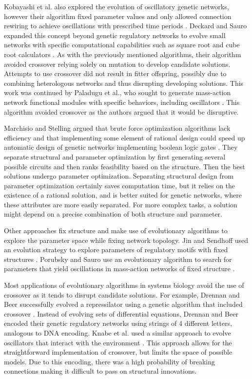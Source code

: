 \documentclass[12pt]{report}
\begin{document}
Kobayashi et al. also explored the evolution of oscillatory genetic networks, however their algorithm fixed parameter values and only allowed connection rewiring to achieve oscillations with prescribed time periods \cite{kobayashi_evolutionary_2010}. Deckard and Sauro expanded this concept beyond genetic regulatory networks to evolve small networks with specific computational capabilities such as square root and cube root calculators \cite{deckard_preliminary_2004}. As with the previously mentioned algorithms, their algorithm avoided crossover relying solely on mutation to develop candidate solutions. Attempts to use crossover did not result in fitter offspring, possibly due to combining heterologous networks and thus disrupting developing solutions. This work was continued by Paladugu et al., who sought to generate mass-action network functional modules with specific behaviors, including oscillators \cite{Paladugu2006}.  This algorithm avoided crossover as the authors argued that it would be disruptive.

Marchisio and Stelling argued that brute force optimization algorithms lack efficiency and that implementing some element of rational design could speed up automatic design of genetic networks implementing boolean logic gates \cite{marchisio_automatic_2011}. They separate structural and parameter optimization by first generating several possible circuits and then ranks feasibility based on the structure. Then the best solutions undergo parameter optimization. Separating structural design from parameter optimization certainly saves computation time, but it relies on the existence of a rational solution, and is better suited for genetic networks, where these attributes are more easily separated. For more complex tasks, a solution might depend on a precise combination of both structure and parameter.

Other approaches fix structure and make use of evolutionary algorithms to explore the parameter space while fixing network topology. Jin and Sendhoff used an evolution strategy to explore parameters of regulatory motifs with fixed structures \cite{jin_evolving_2008}. Porubsky and Sauro use an evolutionary algorithm to search for parameters that yield oscillations in mass-action networks of fixed structure \cite{porubsky2019}.

Most applications of evolutionary algorithms in systems biology avoid the use of crossover as it tends to disrupt candidate solutions. For example, Drennan and Beer successfully evolved a repressilator using a genetic algorithm that included crossover \cite{drennan_beer}. Instead of evolving sets of differential equations, Drennan and Beer encoded their genetic regulatory networks using strings of 4 different letters, analogous to DNA encoding. Knabe et al. used a similar approach to evolve oscillators that interact with the environment \cite{knabe}. This approach allows for the straightforward implementation of crossover, but limits the space of possible models. Due to this encoding, there was a high probability of breaking connections making it difficult to pass on structural innovations.
\end{document}
